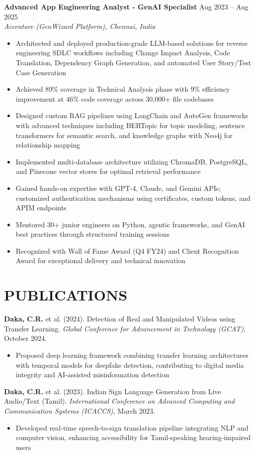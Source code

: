 \documentclass[11pt,a4paper]{article}
\newcommand{\CVItem}[1]{\item{#1}}
\newcommand{\CVSubheading}[4]{
  \vspace{2pt}
  \textbf{#1} \hfill #2 \\
  \textit{#3} \hfill \textit{#4}
  \vspace{3pt}
}
\begin{document}
\CVSubheading
{Advanced App Engineering Analyst - GenAI Specialist}
{Aug 2023 -- Aug 2025}
{Accenture (GenWizard Platform), Chennai, India}
{}
\begin{itemize}
    \CVItem{Architected and deployed production-grade LLM-based solutions for reverse engineering SDLC workflows including Change Impact Analysis, Code Translation, Dependency Graph Generation, and automated User Story/Test Case Generation}
    \CVItem{Achieved 89\% coverage in Technical Analysis phase with 9\% efficiency improvement at 46\% code coverage across 30,000+ file codebases}
    \CVItem{Designed custom RAG pipelines using LangChain and AutoGen frameworks with advanced techniques including BERTopic for topic modeling, sentence transformers for semantic search, and knowledge graphs with Neo4j for relationship mapping}
    \CVItem{Implemented multi-database architecture utilizing ChromaDB, PostgreSQL, and Pinecone vector stores for optimal retrieval performance}
    \CVItem{Gained hands-on expertise with GPT-4, Claude, and Gemini APIs; customized authentication mechanisms using certificates, custom tokens, and APIM endpoints}
    \CVItem{Mentored 30+ junior engineers on Python, agentic frameworks, and GenAI best practices through structured training sessions}
    \CVItem{Recognized with Wall of Fame Award (Q4 FY24) and Client Recognition Award for exceptional delivery and technical innovation}
\end{itemize}

\section{PUBLICATIONS}

\textbf{Daka, C.R.} et al. (2024). Detection of Real and Manipulated Videos using Transfer Learning. \textit{Global Conference for Advancement in Technology (GCAT)}, October 2024.
\begin{itemize}
    \CVItem{Proposed deep learning framework combining transfer learning architectures with temporal models for deepfake detection, contributing to digital media integrity and AI-assisted misinformation detection}
\end{itemize}

\textbf{Daka, C.R.} et al. (2023). Indian Sign Language Generation from Live Audio/Text (Tamil). \textit{International Conference on Advanced Computing and Communication Systems (ICACCS)}, March 2023.
\begin{itemize}
    \CVItem{Developed real-time speech-to-sign translation pipeline integrating NLP and computer vision, enhancing accessibility for Tamil-speaking hearing-impaired users}
\end{itemize}
\end{document}
